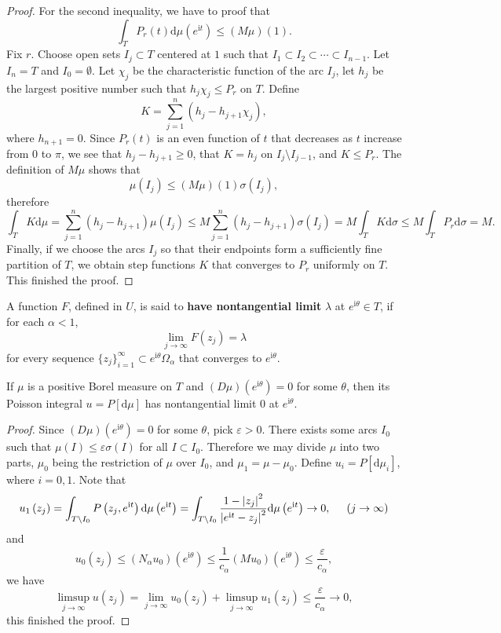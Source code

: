 \begin{proof}
For the second inequality, we have to proof that 
$$
\int_T{P_r\left( t \right) \mathrm{d}\mu \left( e^{\mathrm{i}t} \right)}\le \left( M\mu \right) \left( 1 \right) .
$$
Fix $r$. Choose open sets $I_j\subset T$ centered at $1$ such that $I_1\subset I_2\subset\cdots\subset I_{n-1}$. Let $I_n=T$ and $I_0=\emptyset$. Let $\chi_j$ be the characteristic function of the arc $I_j$, let $h_j$ be the largest positive number such that $h_j\chi_j\le P_r$ on $T$. Define 
$$K=\sum_{j=1}^n(h_j-h_{j+1}\chi_j),$$
where $h_{n+1}=0$. Since $P_r(t)$ is an even function of $t$ that decreases as $t$ increase from $0$ to $\pi$, we see that $h_j-h_{j+1}\ge 0$, that $K=h_j$ on $I_j\setminus I_{j-1}$, and $K\le P_r$. The definition of $M\mu$ shows that 
$$\mu(I_j)\le (M\mu)(1)\sigma(I_j),$$
therefore 
$$
\int_T{K\mathrm{d}\mu}=\sum_{j=1}^n{\left( h_j-h_{j+1} \right) \mu \left( I_j \right)}\le M\sum_{j=1}^n{\left( h_j-h_{j+1} \right) \sigma \left( I_j \right)}=M\int_T{K\mathrm{d}\sigma}\le M\int_T{P_r\mathrm{d}\sigma}=M.
$$
Finally, if we choose the arcs $I_j$ so that their endpoints form a sufficiently fine partition of $T$, we obtain step functions $K$ that converges to $P_r$ uniformly on $T$. This finished the proof.
\end{proof}
A function $F$, defined in $U$, is said to \textbf{have nontangential limit} $\lambda$ at $e^{\mathrm{i}\theta}\in T$, if for each $\alpha<1$, 
$$\lim_{j\to\infty}F(z_j)=\lambda$$
for every sequence $\{z_j\}_{i=1}^\infty\subset e^{\mathrm{i}\theta}\Omega_\alpha$ that converges to $e^{\mathrm{i}\theta}$.\par
\begin{theorem}
If $\mu$ is a positive Borel measure on $T$ and $(D\mu)(e^{\mathrm{i}\theta})=0$ for some $\theta$, then its Poisson integral $u=P[\mathrm{d}\mu]$ has nontangential limit $0$ at $e^{\mathrm{i}\theta}$.
\end{theorem}
\begin{proof}
Since $(D\mu)(e^{\mathrm{i}\theta})=0$ for some $\theta$, pick $\varepsilon>0$. There exists some arcs $I_0$ such that $\mu(I)\le\varepsilon\sigma(I)$ for all $I\subset I_0$. Therefore we may divide $\mu$ into two parts, $\mu_0$ being the restriction of $\mu$ over $I_0$, and $\mu_1=\mu-\mu_0$. Define $u_i=P[\mathrm{d}\mu_i]$, where $i=0,1$. Note that 
$$
u_1\left( z_j \right) =\int_{T\setminus I_0}{P\left( z_j,e^{\mathrm{i}t} \right) \mathrm{d}\mu \left( e^{\mathrm{i}t} \right)}=\int_{T\setminus I_0}{\frac{1-\left| z_j \right|^2}{\left| e^{\mathrm{i}t}-z_j \right|^2}\mathrm{d}\mu \left( e^{\mathrm{i}t} \right)}\rightarrow 0,\hspace{0.5cm}\left( j\rightarrow \infty \right) 
$$
and 
$$
u_0\left( z_j \right) \le \left( N_{\alpha}u_0 \right) \left( e^{\mathrm{i}\theta} \right) \le \frac{1}{c_{\alpha}}\left( Mu_0 \right) \left( e^{\mathrm{i}\theta} \right) \le \frac{\varepsilon}{c_{\alpha}},
$$
we have 
$$
\mathop {\lim\mathrm{sup}} \limits_{j\rightarrow \infty}u\left( z_j \right) =\lim_{j\rightarrow \infty} u_0\left( z_j \right) +\mathop {\lim\mathrm{sup}} \limits_{j\rightarrow \infty}u_1\left( z_j \right) \le \frac{\varepsilon}{c_{\alpha}}\rightarrow 0,
$$
this finished the proof.
\end{proof}
